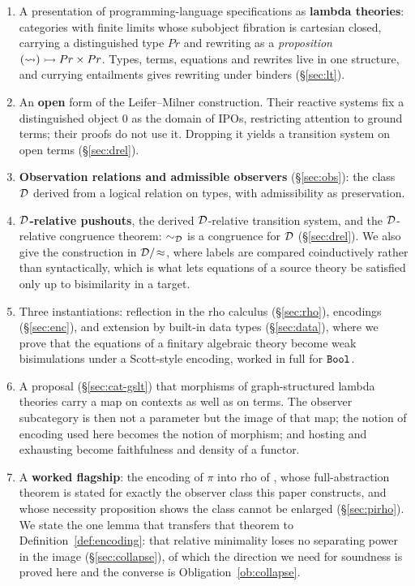 \documentclass{article}
\begin{document}
\begin{enumerate}
    \item A presentation of programming-language specifications as \textbf{lambda theories}: categories with finite limits whose subobject fibration is cartesian closed, carrying a distinguished type $Pr$ and rewriting as a \emph{proposition} $(\rightsquigarrow)\rightarrowtail Pr\times Pr$. Types, terms, equations and rewrites live in one structure, and currying entailments gives rewriting under binders (\S\ref{sec:lt}).
    \item An \textbf{open} form of the Leifer--Milner construction. Their reactive systems fix a distinguished object $0$ as the domain of IPOs, restricting attention to ground terms; their proofs do not use it. Dropping it yields a transition system on open terms (\S\ref{sec:drel}).
    \item \textbf{Observation relations and admissible observers} (\S\ref{sec:obs}): the class $\mathcal{D}$ derived from a logical relation on types, with admissibility as preservation.
    \item \textbf{$\mathcal{D}$-relative pushouts}, the derived $\mathcal{D}$-relative transition system, and the $\mathcal{D}$-relative congruence theorem: $\sim_{\mathcal{D}}$ is a congruence for $\mathcal{D}$ (\S\ref{sec:drel}). We also give the construction in $\mathcal{D}/\!\approx$, where labels are compared coinductively rather than syntactically, which is what lets equations of a source theory be satisfied only up to bisimilarity in a target.
    \item Three instantiations: reflection in the rho calculus (\S\ref{sec:rho}), encodings (\S\ref{sec:enc}), and extension by built-in data types (\S\ref{sec:data}), where we prove that the equations of a finitary algebraic theory become weak bisimulations under a Scott-style encoding, worked in full for $\mathtt{Bool}$.
    \item A proposal (\S\ref{sec:cat-gslt}) that morphisms of graph-structured lambda theories carry a map on contexts as well as on terms. The observer subcategory is then not a parameter but the image of that map; the notion of encoding used here becomes the notion of morphism; and hosting and exhausting become faithfulness and density of a functor.
    \item A \textbf{worked flagship}: the encoding of $\pi$ into rho of \citet{nowns}, whose full-abstraction theorem is stated for exactly the observer class this paper constructs, and whose necessity proposition shows the class cannot be enlarged (\S\ref{sec:pirho}). We state the one lemma that transfers that theorem to Definition~\ref{def:encoding}: that relative minimality loses no separating power in the image (\S\ref{sec:collapse}), of which the direction we need for soundness is proved here and the converse is Obligation~\ref{ob:collapse}.

\end{enumerate}
\end{document}
